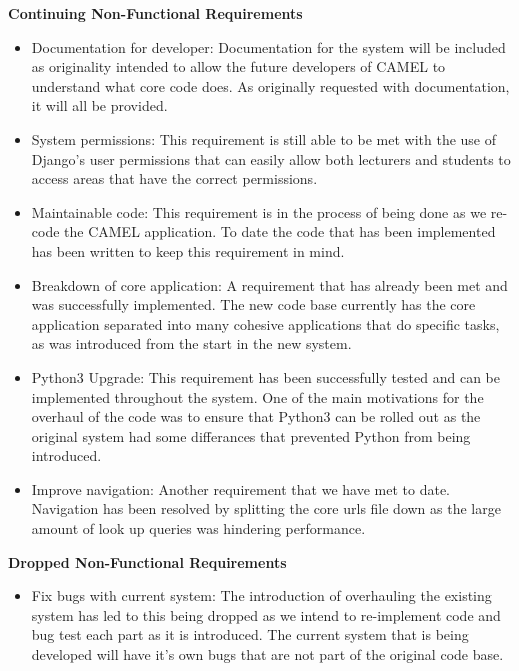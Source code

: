 	\textbf{Continuing Non-Functional Requirements}
	\begin{itemize}
		\item Documentation for developer: Documentation for the system will be included as originality intended to allow the future developers of CAMEL to understand what core code does. As originally requested with documentation, it will all be provided.    
		\item System permissions: This requirement is still able to be met with the use of Django's user permissions that can easily allow both lecturers and students to access areas that have the correct permissions. 
		\item Maintainable code: This requirement is in the process of being done as we re-code the CAMEL application. To date the code that has been implemented has been written to keep this requirement in mind.
		\item Breakdown of core application: A requirement that has already been met and was successfully implemented. The new code base currently has the core application separated into many cohesive applications that do specific tasks, as was introduced from the start in the new system.   
		\item Python3 Upgrade: This requirement has been successfully tested and can be implemented throughout the system. One of the main motivations for the overhaul of the code was to ensure that Python3 can be rolled out as the original system had some differances that prevented Python from being introduced.   
		\item Improve navigation: Another requirement that we have met to date. Navigation has been resolved by splitting the core urls file down as the large amount of look up queries was hindering performance.
	\end{itemize}
	
	\textbf{Dropped Non-Functional Requirements}
	\begin{itemize}
		\item Fix bugs with current system: The introduction of overhauling the existing system has led to this being dropped as we intend to re-implement code and bug test each part as it is introduced. The current system that is being developed will have it's own bugs that are not part of the original code base.   
	\end{itemize}
	